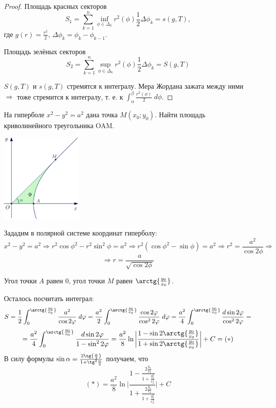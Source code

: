 \begin{proof}
    	Площадь красных секторов
    	\[ S_1 = \sum_{k = 1}^n \inf_{\phi \in \Delta_k} r^2(\phi) \frac{1}{2} \Delta\phi_k = s(g, T), \]
    	где $g(r) = \frac{r^2}{2}$, $\Delta\phi_k = \phi_k - \phi_{k - 1}$.
    	
    	Площадь зелёных секторов
    	\[ S_2 = \sum_{k = 1}^n \sup_{\phi \in \Delta_k} r^2(\phi) \frac{1}{2} \Delta\phi_k = S(g, T) \]
    	
    	$S(g, T)$ и $s(g, T)$ стремятся к интегралу. Мера Жордана зажата между ними $\Rightarrow$ тоже стремится к интегралу, т. е. к $\int_{\alpha}^{\beta} \frac{r^2(\phi)}{2} \; d\phi$.
    \end{proof}
    
    \begin{example}
    	На гиперболе $x^2 - y^2 = a^2$ дана точка $M(x_0; y_0)$. Найти площадь криволинейного треугольника OAM. 
    \end{example}
    
    \begin{center}
    	\includegraphics[width=0.3\textwidth]{img/lecture33/the_area_of_the_figure3}
    \end{center}
    
    Зададим в полярной системе координат гиперболу:
    \[ x^2 - y^2 = a^2 \Rightarrow r^2 \cos{\phi}^2 - r^2 \sin^2{\phi} = a^2 \Rightarrow r^2 (\cos{\phi}^2 - \sin{\phi}) = a^2 \Rightarrow r^2 = \frac{a^2}{\cos{2\phi}} \Rightarrow \]
    \[ \Rightarrow r = \frac{a}{\sqrt{\cos{2\phi}}} \]
    
    Угол точки $A$ равен 0, угол точки $M$ равен $\arctg{\frac{y_0}{x_0}}$.
    
    Осталось посчитать интеграл:
    \[ S = \frac{1}{2} \int_0^{\arctg{\frac{y_0}{x_0}}} \frac{a^2}{\cos{2\phi}} \; d\phi = \frac{a^2}{2} \int_0^{\arctg{\frac{y_0}{x_0}}} \frac{\cos{2\phi}}{\cos^2{2\phi}} \; d\phi = \frac{a^2}{4} \int_0^{\arctg{\frac{y_0}{x_0}}} \frac{d\sin{2\phi}}{\cos^2{2\phi}} = \]
    \[ = \frac{a^2}{4} \int_0^{\arctg{\frac{y_0}{x_0}}} \frac{d\sin{2\phi}}{1 - \sin^2{2\phi}} = \frac{a^2}{8} \ln{\bigg|\frac{1 - \sin{2\arctg{\frac{y_0}{x_0}}}}{1 + \sin{2\arctg{\frac{y_0}{x_0}}}}\bigg|} + C = (*) \]
    В силу формулы $\sin{\alpha} = \frac{2\tg{\frac{\alpha}{2}}}{1 + \tg^2{\frac{\alpha}{2}}}$ получаем, что
    \[ (*) = \frac{a^2}{8} \ln{\bigg|\frac{1 - \frac{2 \frac{y_0}{x_0}}{1 + \frac{y_0^2}{x_0^2}}}{1 + \frac{2 \frac{y_0}{x_0}}{1 + \frac{y_0^2}{x_0^2}}}\bigg|} + C \]
    
